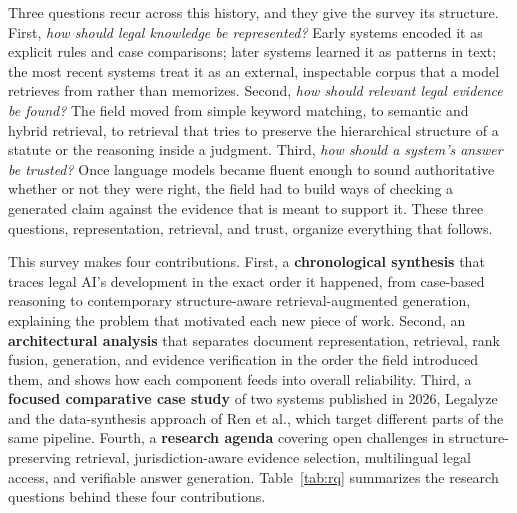 Three questions recur across this history, and they give the survey its structure. First,
\emph{how should legal knowledge be represented?} Early systems encoded it as explicit rules and
case comparisons; later systems learned it as patterns in text; the most recent systems treat it as
an external, inspectable corpus that a model retrieves from rather than memorizes. Second, \emph{how
should relevant legal evidence be found?} The field moved from simple keyword matching, to semantic
and hybrid retrieval, to retrieval that tries to preserve the hierarchical structure of a statute or
the reasoning inside a judgment. Third, \emph{how should a system's answer be trusted?} Once
language models became fluent enough to sound authoritative whether or not they were right, the
field had to build ways of checking a generated claim against the evidence that is meant to support
it. These three questions, representation, retrieval, and trust, organize everything that follows.

This survey makes four contributions. First, a \textbf{chronological synthesis} that traces legal
AI's development in the exact order it happened, from case-based reasoning to contemporary
structure-aware retrieval-augmented generation, explaining the problem that motivated each new piece
of work. Second, an \textbf{architectural analysis} that separates document representation,
retrieval, rank fusion, generation, and evidence verification in the order the field introduced
them, and shows how each component feeds into overall reliability. Third, a \textbf{focused
comparative case study} of two systems published in 2026, Legalyze and the data-synthesis approach
of Ren et al., which target different parts of the same pipeline. Fourth, a \textbf{research agenda}
covering open challenges in structure-preserving retrieval, jurisdiction-aware evidence selection,
multilingual legal access, and verifiable answer generation. Table~\ref{tab:rq} summarizes the
research questions behind these four contributions.

